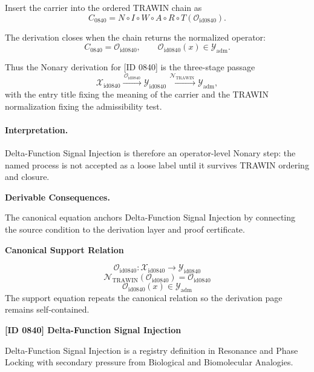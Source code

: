 Insert the carrier into the ordered TRAWIN chain as\[
C_{0840}=N\circ I\circ W\circ A\circ R\circ T(\mathcal{O}_{\mathrm{id0840}}).
\]

The derivation closes when the chain returns the normalized operator:\[
C_{0840}=\mathcal{O}_{\mathrm{id0840}},\qquad \mathcal{O}_{\mathrm{id0840}}(x)\in\mathcal{Y}_{\mathrm{adm}}.
\]

Thus the Nonary derivation for [ID 0840] is the three-stage passage
\[
\mathcal{X}_{\mathrm{id0840}}\xrightarrow{\,\mathcal{O}_{\mathrm{id0840}}\,} \mathcal{Y}_{\mathrm{id0840}}\xrightarrow{\,\mathcal{N}_{\mathrm{TRAWIN}}\,} \mathcal{Y}_{\mathrm{adm}},
\]
with the entry title fixing the meaning of the carrier and the TRAWIN normalization fixing the admissibility test.

\paragraph{Interpretation.} Delta-Function Signal Injection is therefore an operator-level Nonary step: the named process is not accepted as a loose label until it survives TRAWIN ordering and closure.

\par\vspace{0.35em}
\noindent\textbf{Derivable Consequences.}\quad
\begingroup
\footnotesize
\raggedright
The canonical equation anchors Delta-Function Signal Injection by connecting the source condition to the derivation layer and proof certificate.
\par\endgroup

\noindent\textbf{Canonical Support Relation}\par
\[
\mathcal{O}_{\mathrm{id0840}}:\mathcal{X}_{\mathrm{id0840}}\longrightarrow\mathcal{Y}_{\mathrm{id0840}}
\]
\[
\mathcal{N}_{\mathrm{TRAWIN}}(\mathcal{O}_{\mathrm{id0840}})=\mathcal{O}_{\mathrm{id0840}}
\]
\[
\mathcal{O}_{\mathrm{id0840}}(x)\in\mathcal{Y}_{\mathrm{adm}}
\]
\noindent The support equation repeats the canonical relation so the derivation page remains self-contained.\par

\clearpage
\noindent\textbf{[ID 0840] Delta-Function Signal Injection}\par
\vspace{0.35em}
\begingroup\small
{}
Delta-Function Signal Injection is a registry definition in Resonance and Phase Locking with secondary pressure from Biological and Biomolecular Analogies.

